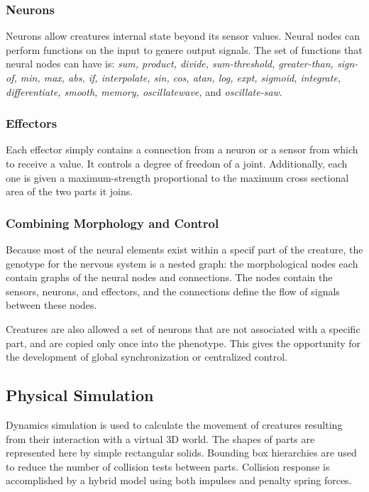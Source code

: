 \documentclass[../main.tex]{subfiles}
\begin{document}
\subsubsection{Neurons}

Neurons allow creatures internal state beyond its sensor values. Neural nodes can perform functions on the input to
genere output signals. The set of functions that neural nodes can have is: \emph{ sum, product, divide, sum-threshold,
greater-than, sign-of, min, max, abs, if, interpolate, sin, cos, atan, log, expt, sigmoid, integrate, differentiate,
smooth, memory, oscillatewave,} and \emph{oscillate-saw}.

\subsubsection{Effectors}
Each effector simply contains a connection from a neuron or a sensor from which to receive a value. It
controls a degree of freedom of a joint. Additionally, each one is given a maximum-strength proportional to the maximum
cross sectional area of the two parts it joins.

\subsubsection{Combining Morphology and Control}

Because most of the neural elements exist within a specif part of the creature, the genotype for the nervous system is
a nested graph: the morphological nodes each contain graphs of the neural nodes and connections. The nodes contain the
sensors, neurons, and effectors, and the connections define the flow of signals between these nodes.

Creatures are also allowed a set of neurons that are not associated with a specific part, and are copied only once into
the phenotype. This gives the opportunity for the development of global synchronization or centralized control.

\subsection{Physical Simulation}
Dynamics simulation is used to calculate the movement of creatures resulting from their interaction with a virtual 3D
world. The shapes of parts are represented here by simple rectangular solids.  Bounding box hierarchies are used to
reduce the number of collision tests between parts. Collision response is accomplished by a hybrid model using both
impulses and penalty spring forces.
\end{document}
